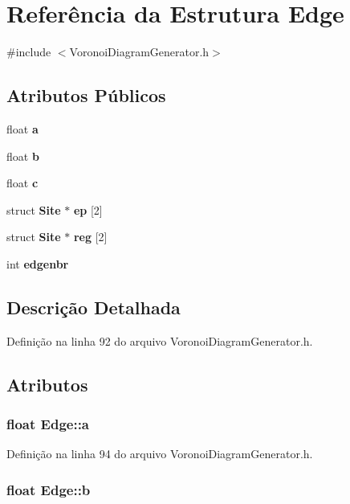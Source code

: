 \section{Referência da Estrutura Edge}
\label{struct_edge}


{\ttfamily \#include $<$Voronoi\+Diagram\+Generator.\+h$>$}

\subsection*{Atributos Públicos}
\begin{DoxyCompactItemize}
\item 
float {\bf a}
\item 
float {\bf b}
\item 
float {\bf c}
\item 
struct {\bf Site} $\ast$ {\bf ep} [2]
\item 
struct {\bf Site} $\ast$ {\bf reg} [2]
\item 
int {\bf edgenbr}
\end{DoxyCompactItemize}


\subsection{Descrição Detalhada}


Definição na linha 92 do arquivo Voronoi\+Diagram\+Generator.\+h.



\subsection{Atributos}
\subsubsection[{a}]{\setlength{\rightskip}{0pt plus 5cm}float Edge\+::a}\label{struct_edge_ad6dc0849e76aea6859a31b1f2a9f57c3}


Definição na linha 94 do arquivo Voronoi\+Diagram\+Generator.\+h.

\subsubsection[{b}]{\setlength{\rightskip}{0pt plus 5cm}float Edge\+::b}\label{struct_edge_a598727b4d7ae07ebcd98351c7258a845}


